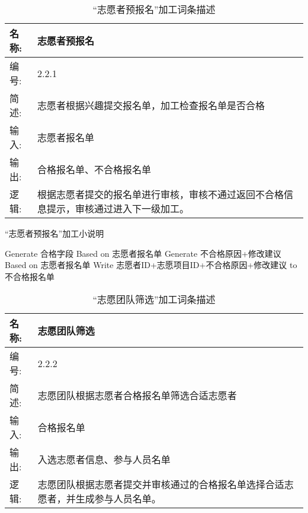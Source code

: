 \begin{table}[H]  
\caption{``志愿者预报名”加工词条描述}  
\begin{center}  
    \begin{tabular}{l p{11cm}} 
        \hline
        \quad 名称: & 志愿者预报名\\
        \hline
        \quad 编号: & 2.2.1 \\
        \hline
        \quad 简述: & 志愿者根据兴趣提交报名单，加工检查报名单是否合格 \\
        \hline
        \quad 输入:& 志愿者报名单 \\
        \hline
        \quad 输出:& 合格报名单、不合格报名单\\
        \hline
        \quad 逻辑:& 根据志愿者提交的报名单进行审核，审核不通过返回不合格信息提示，审核通过进入下一级加工。 \\
        \hline
    \end{tabular}
    \label{tab1}
\end{center}
\end{table}

\begin{algorithm}[H]
    \renewcommand{\thealgorithm}{}
    \caption{``志愿者预报名”加工小说明} 
    \label{alg3} 
    \begin{algorithmic}[1]
        \STATE Generate 合格字段 Based on 志愿者报名单
        \ELSE
        \STATE Generate 不合格原因+修改建议 Based on 志愿者报名单
        \STATE Write 志愿者ID+志愿项目ID+{不合格原因+修改建议} to 不合格报名单
        \ENDIF 
    \end{algorithmic} 
\end{algorithm}


\begin{table}[H]  
\caption{``志愿团队筛选”加工词条描述}  
\begin{center}  
    \begin{tabular}{l p{11cm}} 
        \hline
        \quad 名称: & 志愿团队筛选\\
        \hline
        \quad 编号: & 2.2.2 \\
        \hline
        \quad 简述: & 志愿团队根据志愿者合格报名单筛选合适志愿者 \\
        \hline
        \quad 输入:& 合格报名单 \\
        \hline
        \quad 输出:& 入选志愿者信息、参与人员名单\\
        \hline
        \quad 逻辑:& 志愿团队根据志愿者提交并审核通过的合格报名单选择合适志愿者，并生成参与人员名单。 \\
        \hline
    \end{tabular}
    \label{tab1}
\end{center}
\end{table}


